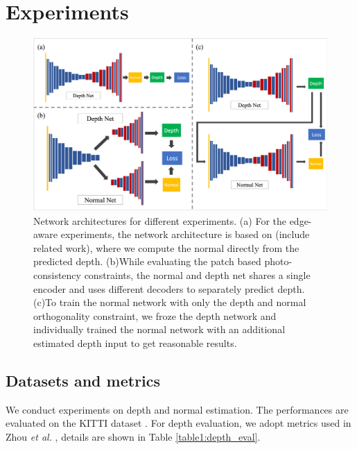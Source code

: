 \documentclass[10pt,twocolumn,letterpaper]{article}
\begin{document}
\section{Experiments}
\begin{figure}
  \includegraphics[width=\columnwidth ]{network.png}
  \caption{Network architectures for different experiments. (a) For the edge-aware experiments, the network architecture is based on (include related work), where we compute the normal directly from the predicted depth. (b)While evaluating the patch based photo-consistency constraints, the normal and depth net shares a single encoder and uses different decoders to separately predict depth. (c)To train the normal network with only the depth and normal orthogonality constraint, we froze the depth network and individually trained the normal network with an additional estimated depth input to get reasonable results.}
  \label{fig:network}
\end{figure}

\subsection{Datasets and metrics}
We conduct experiments on depth and normal estimation. The performances are evaluated on the KITTI dataset \cite{kitti}. For depth evaluation, we adopt metrics used in Zhou \textit{et al.} \cite{zhou2017unsupervised}, details are shown in Table \ref{table1:depth_eval}.
\end{document}
